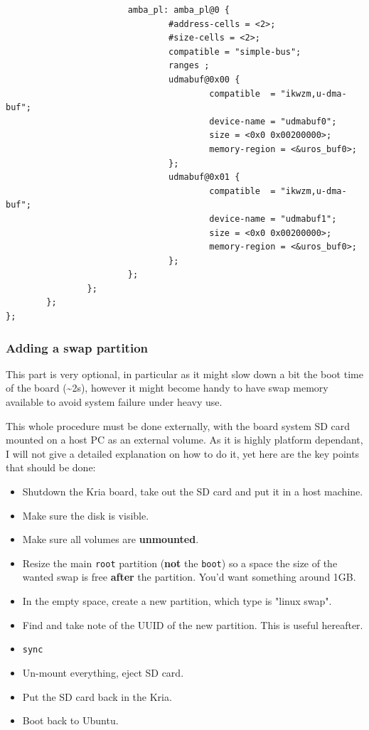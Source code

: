 \documentclass[10pt]{article}
\begin{document}
\begin{verbatim}
                        amba_pl: amba_pl@0 {
                                #address-cells = <2>;
                                #size-cells = <2>;
                                compatible = "simple-bus";
                                ranges ;
                                udmabuf@0x00 {
                                        compatible  = "ikwzm,u-dma-buf";
                                        device-name = "udmabuf0";
                                        size = <0x0 0x00200000>;
                                        memory-region = <&uros_buf0>;
                                };
                                udmabuf@0x01 {
                                        compatible  = "ikwzm,u-dma-buf";
                                        device-name = "udmabuf1";
                                        size = <0x0 0x00200000>;
                                        memory-region = <&uros_buf0>;
                                };
                        };
                };
        };
};
\end{verbatim}


\subsubsection{Adding a swap partition}
\label{sec:org02a22a0}
This part is very optional, in particular as it might slow down a bit the
boot time of the board (\textasciitilde{}2s), however it might become handy to have swap memory
available to avoid system failure under heavy use.

This whole procedure must be done externally, with the board system SD card
mounted on a host PC as an external volume.  As it is highly platform dependant,
I will not give a detailed explanation on how to do it, yet here are the key
points that should be done:
\begin{itemize}
\item Shutdown the Kria board, take out the SD card and put it in a host machine.
\item Make sure the disk is visible.
\item Make sure all volumes are \textbf{unmounted}.
\item Resize the main \texttt{root} partition (\textbf{not} the \texttt{boot}) so a space the size of the
wanted swap is free \textbf{after} the partition. You'd want something around 1GB.
\item In the empty space, create a new partition, which type is "linux swap".
\item Find and take note of the UUID of the new partition. This is useful hereafter.
\item \texttt{sync}
\item Un-mount everything, eject SD card.
\item Put the SD card back in the Kria.
\item Boot back to Ubuntu.
\end{itemize}
\end{document}
